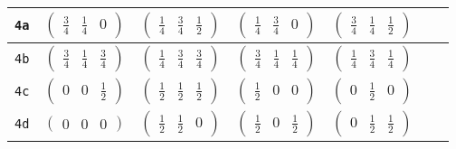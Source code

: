 \documentclass[fleqn,9pt,landscape]{jsarticle}
\begin{document}
\begin{center}
\begin{longtable}{ccccccc}
{\tt 4a} & $ \begin{pmatrix} \frac{3}{4} & \frac{1}{4} & 0 \end{pmatrix} $ & $ \begin{pmatrix} \frac{1}{4} & \frac{3}{4} & \frac{1}{2} \end{pmatrix} $ & $ \begin{pmatrix} \frac{1}{4} & \frac{3}{4} & 0 \end{pmatrix} $ & $ \begin{pmatrix} \frac{3}{4} & \frac{1}{4} & \frac{1}{2} \end{pmatrix} $ & $  $ & $  $ \\ \hline
{\tt 4b} & $ \begin{pmatrix} \frac{3}{4} & \frac{1}{4} & \frac{3}{4} \end{pmatrix} $ & $ \begin{pmatrix} \frac{1}{4} & \frac{3}{4} & \frac{3}{4} \end{pmatrix} $ & $ \begin{pmatrix} \frac{3}{4} & \frac{1}{4} & \frac{1}{4} \end{pmatrix} $ & $ \begin{pmatrix} \frac{1}{4} & \frac{3}{4} & \frac{1}{4} \end{pmatrix} $ & $  $ & $  $ \\ \hline
{\tt 4c} & $ \begin{pmatrix} 0 & 0 & \frac{1}{2} \end{pmatrix} $ & $ \begin{pmatrix} \frac{1}{2} & \frac{1}{2} & \frac{1}{2} \end{pmatrix} $ & $ \begin{pmatrix} \frac{1}{2} & 0 & 0 \end{pmatrix} $ & $ \begin{pmatrix} 0 & \frac{1}{2} & 0 \end{pmatrix} $ & $  $ & $  $ \\ \hline
{\tt 4d} & $ \begin{pmatrix} 0 & 0 & 0 \end{pmatrix} $ & $ \begin{pmatrix} \frac{1}{2} & \frac{1}{2} & 0 \end{pmatrix} $ & $ \begin{pmatrix} \frac{1}{2} & 0 & \frac{1}{2} \end{pmatrix} $ & $ \begin{pmatrix} 0 & \frac{1}{2} & \frac{1}{2} \end{pmatrix} $ & $  $ & $  $ \\ \hline

\end{longtable}
\end{center}
\end{document}
